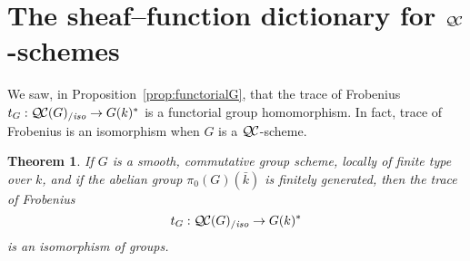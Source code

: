 \documentclass[11pt]{amsart}
\theoremstyle{plain}
\newtheorem{theorem}{Theorem}[section]
\theoremstyle{definition}
\theoremstyle{remark}
\newcommand{\bFq}{\bar{k}}
\newcommand{\Fq}{k}
\newcommand{\QC}{{\mathcal{Q\hskip-0.8pt C}}}
\newcommand{\QCiso}[1]{\QC(#1)_{/\textit{iso}}}
\newcommand{\trFrob}[1]{t_{#1}}
\begin{document}
\section{The sheaf--function dictionary for $\QC$-schemes}
\label{sec:snake}

We saw, in Proposition~\ref{prop:functorialG}, that the trace of Frobenius
$\trFrob{G} : \QCiso{G} \to G(\Fq)^*$ is a functorial group homomorphism.
In fact, trace of Frobenius is an isomorphism when $G$ is a $\QC$-scheme.

%
\begin{theorem}\label{thm:snake}
  If $G$ is a smooth, commutative group scheme, locally of finite type over
  $\Fq$, and if the abelian group $\pi_0(G)(\bFq)$
  is finitely generated, then the trace of Frobenius
  \[
  \trFrob{G} : \QCiso{G} \to G(\Fq)^*
  \]
  is an isomorphism of groups.
\end{theorem}
\end{document}
